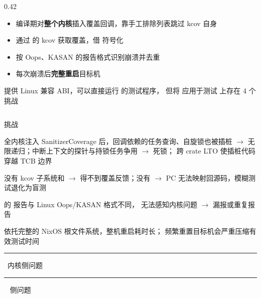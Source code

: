 \begin{frame}{\syz{}}
\begin{columns}[T,onlytextwidth]
\begin{column}{0.42\textwidth}
\vspace{1.5mm}
\begin{itemize}\small
  \item 编译期对\textbf{整个内核}插入覆盖回调，靠手工排除列表跳过 kcov 自身
  \item 通过  的 kcov 获取覆盖，借  符号化
  \item 按 Oops、KASAN 的报告格式识别崩溃并去重
  \item 每次崩溃后\textbf{完整重启}目标机
\end{itemize}

\vspace{2mm}
\begin{tcolorbox}[syzcard,fontupper=\small]
  \aster{} 提供 Linux 兼容 ABI，可以直接运行 \syz{} 的测试程序，
  但将 \syz{} 应用于测试 \aster{} 上存在 \alert{4 个挑战}
\end{tcolorbox}
\end{column}
\end{columns}
\end{frame}

\begin{frame}{挑战}
\begin{tcbraster}[raster columns=2,raster equal height=rows,
    raster column skip=2mm,raster row skip=2mm]
\begin{tcolorbox}[rustcard,title={\faIcon{sync-alt}\ 挑战一：插桩与运行时互相干扰}]
  全内核注入 SanitizerCoverage 后，回调依赖的任务查询、自旋锁也被插桩
  $\to$ \alert{无限递归}；中断上下文的探针与持锁任务争用 $\to$ \alert{死锁}；
  跨 crate LTO 使插桩代码\alert{穿越 TCB 边界}
\end{tcolorbox}
\begin{tcolorbox}[rustcard,title={\faEyeSlash\ 挑战二：覆盖与符号接口缺失}]
  \aster{} 没有 kcov 子系统和 
  $\to$ \alert{得不到覆盖反馈}；没有 
  $\to$ \alert{PC 无法映射回源码}，模糊测试退化为盲测
\end{tcolorbox}
\begin{tcolorbox}[syzcard,title={\faBug\ 挑战三：Rust panic 无法识别与去重}]
  \aster{} 的  报告与 Linux Oops/KASAN 格式不同，
  \syz{} 无法感知内核问题 $\to$ \alert{漏报}或\alert{重复报告}
\end{tcolorbox}
\begin{tcolorbox}[syzcard,title={\faHourglassHalf\ 挑战四：整机重启开销高}]
  \aster{} 依托完整的 NixOS 根文件系统，整机重启耗时长；
  频繁重置目标机会\alert{严重压缩有效测试时间}
\end{tcolorbox}
\end{tcbraster}

\vspace{2mm}
\centering\small
\textcolor{SARust}{\rule{2.5mm}{2.5mm}}\ 内核侧问题
\qquad
\textcolor{SASyz}{\rule{2.5mm}{2.5mm}}\ \syz{} 侧问题
\end{frame}
